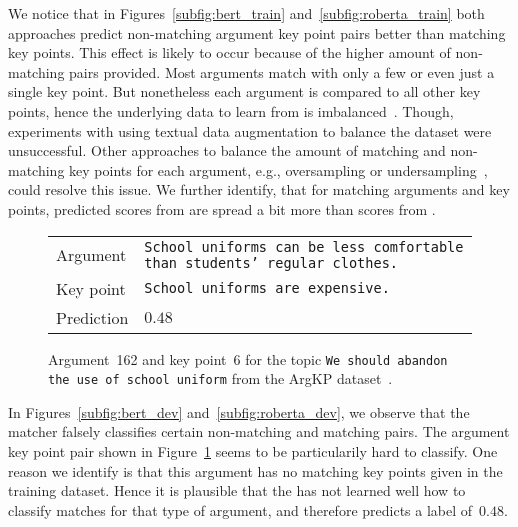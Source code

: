 We notice that in Figures~\ref{subfig:bert_train} and~\ref{subfig:roberta_train} both approaches predict non-matching argument key point pairs better than matching key points.
This effect is likely to occur because of the higher amount of non-matching pairs provided.
Most arguments match with only a few or even just a single key point.
But nonetheless each argument is compared to all other key points, hence the underlying data to learn from is imbalanced~\cite{BarandelaVSF2004}.
Though, experiments with using textual data augmentation to balance the dataset were unsuccessful.
Other approaches to balance the amount of matching and non-matching key points for each argument, e.g., oversampling or undersampling~\cite{Dietterich1995}, could resolve this issue.
We further identify, that for matching arguments and key points, predicted scores from \BertBase are spread a bit more than scores from \RobertaBase.

\begin{figure}
    \begin{tabularx}{\linewidth}{@{}lX@{}}
        Argument & \texttt{School uniforms can be less comfortable than students' regular clothes.} \\
        Key point & \texttt{School uniforms are expensive.} \\
        Prediction & \(0.48\) \\
    \end{tabularx}
    \caption{Argument~162 and key point~6 for the topic \texttt{We should abandon the use of school uniform} from the ArgKP dataset~\cite{Bar-HaimEFKLS2020}.}
    \label{example-4-162-6}
\end{figure}
In Figures~\ref{subfig:bert_dev} and~\ref{subfig:roberta_dev}, we observe that the \BertBase matcher falsely classifies certain non-matching and matching pairs. The argument key point pair shown in Figure~\ref{example-4-162-6} seems to be particularily hard to classify.
One reason we identify is that this argument has no matching key points given in the training dataset.
Hence it is plausible that the \BertBase has not learned well how to classify matches for that type of argument, and therefore predicts a label of~\(0.48\).

